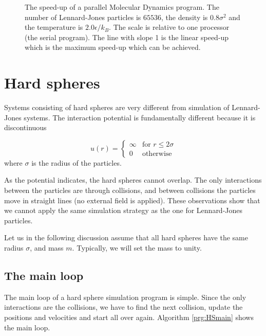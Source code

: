\begin{figure}
  \begin{center}
    
  \end{center}
  \caption[The speed-up of a parallel MD program]{The speed-up of a
   parallel Molecular Dynamics program. The number of Lennard-Jones
   particles is $65536$, the density is $0.8\sigma^2$ and the
   temperature is $2.0\epsilon/k_B$. The scale is relative to one processor (the serial
   program). The line with slope 1 is the linear speed-up which is the
   maximum speed-up which can be achieved.\label{fig:ParallelSpeed}}
\end{figure}


\section{Hard spheres}
\label{sect:HardSpheres}
Systems consisting of hard spheres are very different from
simulation of Lennard-Jones systems. The interaction potential is
fundamentally different because it is discontinuous \ie

\begin{equation}
  u(r) = \begin{cases}
    \infty & \text{for $r\le 2\sigma$} \\
    0      & \text{otherwise}
  \end{cases}
\end{equation}
where $\sigma$ is the radius of the particles.

As the potential indicates, the hard spheres cannot overlap. The only
interactions between the particles are through collisions, and between
collisions the particles move in straight lines (no external field is
applied). These observations show that we cannot apply the same
simulation strategy as the one for Lennard-Jones particles. 

Let us in the following discussion assume that all hard spheres have
the same radius $\sigma$, and mass $m$. Typically, we will set the mass
to unity. 

\subsection{The main loop}
\label{sect:HSnaive}
The main loop of a hard sphere simulation program is simple. Since the
only interactions are the collisions, we have to find the next
collision, update the positions and velocities and start all over
again. Algorithm \ref{prg:HSmain} shows the main loop.

